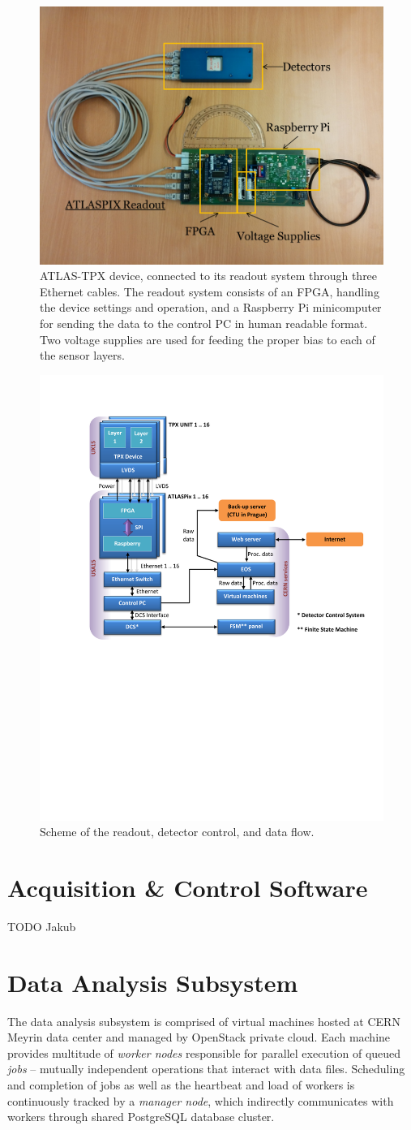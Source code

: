 \documentclass[journal]{IEEEtran}
\begin{document}
\begin{figure}[tbp]
	\centering
        \includegraphics[clip,width=.45\textwidth, angle = 0 ]{Plots/ATLASPIX.png}
      \caption {ATLAS-TPX device, connected to its readout system through three Ethernet cables. The readout system consists of an FPGA, handling the device settings and operation, and a Raspberry Pi minicomputer for sending the data to the control PC in human readable format. Two voltage supplies are used for feeding the proper bias to each of the sensor layers.}
    \label{fig:device_with_readout}
\end{figure}

\begin{figure}[tbp]
	\centering
        \includegraphics[clip, trim={2cm 11.2cm 0cm 2.6cm}, width=.5\textwidth, angle = 0 ]{Plots/Doc1.pdf}
      \caption {Scheme of the readout, detector control, and data flow.}
    \label{fig:data_flow}
\end{figure}

\section{\label{sec:acquisition}Acquisition \& Control Software}
TODO Jakub

\section{\label{sec:analysis}Data Analysis Subsystem}
The data analysis subsystem is comprised of virtual machines hosted at CERN Meyrin data center and managed by OpenStack private cloud. Each machine provides multitude of \textit{worker nodes} responsible for parallel execution of queued \textit{jobs} -- mutually independent operations that interact with data files. Scheduling and completion of jobs as well as the heartbeat and load of workers is continuously tracked by a \textit{manager node}, which indirectly communicates with workers through shared PostgreSQL database cluster.
\end{document}
